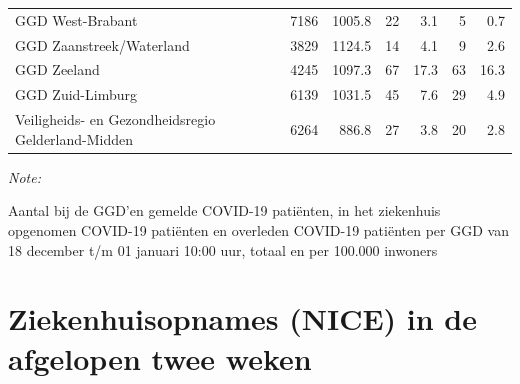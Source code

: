 \documentclass[
  english,
  man,floatsintext]{apa6}
\begin{document}
\begin{table}
\begin{threeparttable}
\begin{tabular}{lrrrrrr}
GGD West-Brabant & 7186 & 1005.8 & 22 & 3.1 & 5 & 0.7\\
GGD Zaanstreek/Waterland & 3829 & 1124.5 & 14 & 4.1 & 9 & 2.6\\
GGD Zeeland & 4245 & 1097.3 & 67 & 17.3 & 63 & 16.3\\
GGD Zuid-Limburg & 6139 & 1031.5 & 45 & 7.6 & 29 & 4.9\\
Veiligheids- en Gezondheidsregio Gelderland-Midden & 6264 & 886.8 & 27 & 3.8 & 20 & 2.8\\
\bottomrule
\end{tabular}
\begin{tablenotes}
\item \textit{Note: } 
\item Aantal bij de GGD’en gemelde COVID-19 patiënten, in het ziekenhuis opgenomen COVID-19 patiënten en overleden COVID-19 patiënten per GGD van 18 december t/m 01 januari 10:00 uur, totaal en per 100.000 inwoners
\end{tablenotes}
\end{threeparttable}
\endgroup{}
\end{table}

\newpage

\hypertarget{ziekenhuisopnames-nice-in-de-afgelopen-twee-weken}{%
\section{Ziekenhuisopnames (NICE) in de afgelopen twee weken}\label{ziekenhuisopnames-nice-in-de-afgelopen-twee-weken}}
\end{document}
